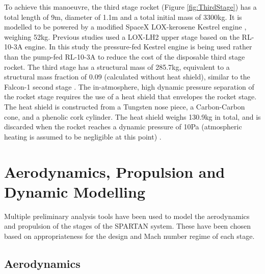 \documentclass[]{aiaa-tc}
\begin{document}
To achieve this manoeuvre, the third stage rocket (Figure \ref{fig:ThirdStage}) has a total length of 9m, diameter of 1.1m and a total initial mass of 3300kg. It is modelled to be powered by a modified SpaceX LOX-kerosene Kestrel engine \cite{Vehicle2008}, weighing 52kg. Previous studies used a LOX-LH2 upper stage based on the RL-10-3A engine\cite{Preller2017}. In this study the pressure-fed Kestrel engine is being used rather than the pump-fed RL-10-3A to reduce the cost of the disposable third stage rocket. The third stage has a structural mass of 285.7kg, equivalent to a structural mass fraction of 0.09 (calculated without heat shield), similar to the Falcon-1 second stage \cite{Vehicle2008}. The in-atmosphere, high dynamic pressure separation of the rocket stage requires the use of a heat shield that envelopes the rocket stage. The heat shield is constructed from a Tungsten nose piece, a Carbon-Carbon cone, and a phenolic cork cylinder. The heat shield weighs 130.9kg in total, and is discarded when the rocket reaches a dynamic pressure of 10Pa (atmospheric heating is assumed to be negligible at this point) \cite{Preller2015a,Preller2017}. 




\section{Aerodynamics, Propulsion and Dynamic Modelling}\label{section:aero}

Multiple preliminary analysis tools have been used to model the aerodynamics and propulsion of the stages of the SPARTAN system. These have been chosen based on appropriateness for the design and Mach number regime of each stage. 

\subsection{Aerodynamics}
\end{document}
